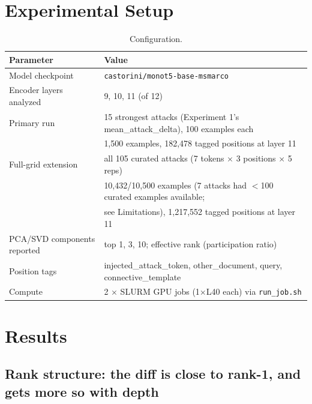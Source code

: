 \documentclass[11pt]{article}
\begin{document}
\section{Experimental Setup}

\begin{table}[H]
\centering
\caption{Configuration.}
\begin{tabular}{ll}
\toprule
Parameter & Value \\
\midrule
Model checkpoint & \texttt{castorini/monot5-base-msmarco} \\
Encoder layers analyzed & 9, 10, 11 (of 12) \\
Primary run & 15 strongest attacks (Experiment 1's mean\_attack\_delta), 100 examples each \\
& 1,500 examples, 182,478 tagged positions at layer 11 \\
Full-grid extension & all 105 curated attacks (7 tokens $\times$ 3 positions $\times$ 5 reps) \\
& 10,432/10,500 examples (7 attacks had $<$100 curated examples available; \\
& see Limitations), 1,217,552 tagged positions at layer 11 \\
PCA/SVD components reported & top 1, 3, 10; effective rank (participation ratio) \\
Position tags & injected\_attack\_token, other\_document, query, connective\_template \\
Compute & 2 $\times$ SLURM GPU jobs (1$\times$L40 each) via \texttt{run\_job.sh} \\
\bottomrule
\end{tabular}
\end{table}

\section{Results}
\label{sec:results}

\subsection{Rank structure: the diff is close to rank-1, and gets more so with depth}
\end{document}
